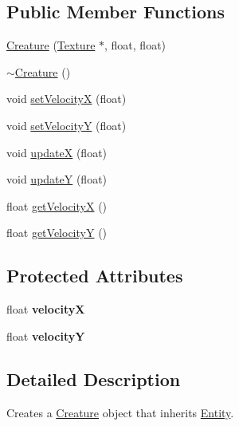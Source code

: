 \subsection*{Public Member Functions}
\begin{DoxyCompactItemize}
\item 
\hyperlink{class_creature_a3512b75b90d921f17d098d55cc55a4c0}{Creature} (\hyperlink{class_texture}{Texture} $\ast$, float, float)
\item 
\hyperlink{class_creature_aa991b23f4813fbdb6f875204ed49814d}{$\sim$\+Creature} ()
\item 
void \hyperlink{class_creature_ab2ad7544f3c7fd24829c8c28ea5c667f}{set\+Velocity\+X} (float)
\item 
void \hyperlink{class_creature_a5aa971df9bf484d62fbe6413f01a661b}{set\+Velocity\+Y} (float)
\item 
void \hyperlink{class_creature_ac10e36c59bd7ec83708b46235aefbc33}{update\+X} (float)
\item 
void \hyperlink{class_creature_ab2bdf6ddfe183c828761bae1da81be47}{update\+Y} (float)
\item 
float \hyperlink{class_creature_a405b16c27bc5617e9c37ac01e166c785}{get\+Velocity\+X} ()
\item 
float \hyperlink{class_creature_a0ca2c7cccf8c8182dcad7a3b6737380b}{get\+Velocity\+Y} ()
\end{DoxyCompactItemize}
\subsection*{Protected Attributes}
\begin{DoxyCompactItemize}
\item 
\hypertarget{class_creature_a6e857406fb17f893ebace230ff8aa05f}{float {\bfseries velocity\+X}}\label{class_creature_a6e857406fb17f893ebace230ff8aa05f}

\item 
\hypertarget{class_creature_a8a3cb01fd7b9d05372749fc9e04ab8dd}{float {\bfseries velocity\+Y}}\label{class_creature_a8a3cb01fd7b9d05372749fc9e04ab8dd}

\end{DoxyCompactItemize}


\subsection{Detailed Description}
Creates a \hyperlink{class_creature}{Creature} object that inherits \hyperlink{class_entity}{Entity}. 

